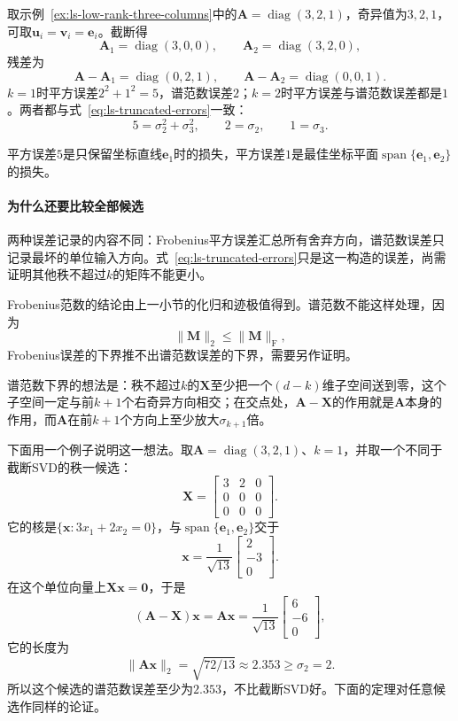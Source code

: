 \begin{example}[对角矩阵的截断误差]
\label{ex:ls-truncated-svd-diagonal}
取示例~\ref{ex:ls-low-rank-three-columns}中的$\bm A=\operatorname{diag}(3,2,1)$，奇异值为$3,2,1$，可取$\bm u_i=\bm v_i=\bm e_i$。截断得
\[
 \bm A_1=\operatorname{diag}(3,0,0),\qquad\bm A_2=\operatorname{diag}(3,2,0),
\]
残差为
\[
 \bm A-\bm A_1=\operatorname{diag}(0,2,1),\qquad\bm A-\bm A_2=\operatorname{diag}(0,0,1).
\]
$k=1$时平方误差$2^2+1^2=5$，谱范数误差$2$；$k=2$时平方误差与谱范数误差都是$1$。两者都与式~\eqref{eq:ls-truncated-errors}一致：
\[
 5=\sigma_2^2+\sigma_3^2,\qquad 2=\sigma_2,\qquad 1=\sigma_3 .
\]

平方误差$5$是只保留坐标直线$\bm e_1$时的损失，平方误差$1$是最佳坐标平面$\operatorname{span}\{\bm e_1,\bm e_2\}$的损失。
\end{example}

\paragraph{为什么还要比较全部候选}
两种误差记录的内容不同：Frobenius平方误差汇总所有舍弃方向，谱范数误差只记录最坏的单位输入方向。式~\eqref{eq:ls-truncated-errors}只是这一构造的误差，尚需证明其他秩不超过$k$的矩阵不能更小。

Frobenius范数的结论由上一小节的化归和迹极值得到。谱范数不能这样处理，因为
\[
 \lVert\bm M\rVert_2\leq\lVert\bm M\rVert_{\mathrm F},
\]
Frobenius误差的下界推不出谱范数误差的下界，需要另作证明。

谱范数下界的想法是：秩不超过$k$的$\bm X$至少把一个$(d-k)$维子空间送到零，这个子空间一定与前$k+1$个右奇异方向相交；在交点处，$\bm A-\bm X$的作用就是$\bm A$本身的作用，而$\bm A$在前$k+1$个方向上至少放大$\sigma_{k+1}$倍。

下面用一个例子说明这一想法。取$\bm A=\operatorname{diag}(3,2,1)$、$k=1$，并取一个不同于截断SVD的秩一候选：
\[
 \bm X=\begin{bmatrix}3&2&0\\0&0&0\\0&0&0\end{bmatrix}.
\]
它的核是$\{\bm x:3x_1+2x_2=0\}$，与$\operatorname{span}\{\bm e_1,\bm e_2\}$交于
\[
 \bm x=\frac1{\sqrt{13}}\begin{bmatrix}2\\-3\\0\end{bmatrix}.
\]
在这个单位向量上$\bm X\bm x=\bm0$，于是
\[
 (\bm A-\bm X)\bm x=\bm A\bm x=\frac1{\sqrt{13}}\begin{bmatrix}6\\-6\\0\end{bmatrix},
\]
它的长度为
\[
 \lVert\bm A\bm x\rVert_2=\sqrt{72/13}\approx2.353\geq\sigma_2=2 .
\]
所以这个候选的谱范数误差至少为$2.353$，不比截断SVD好。下面的定理对任意候选作同样的论证。

